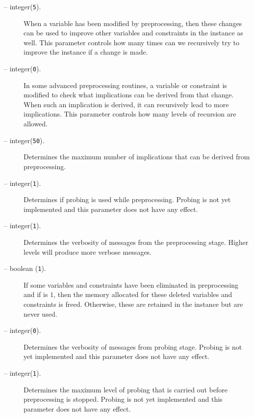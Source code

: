\begin{description}
\item[ -- integer({\tt 5}).]
When a variable has been modified by preprocessing, then these changes can be
used to improve other variables and constraints in the instance as well. This
parameter controls how many times can we recursively try to improve the
instance if a change is made.

\item[ -- integer({\tt 0}).]
In some advanced preprocessing routines, a variable or constraint is modified
to check what implications can be derived from that change. When such an
implication is derived, it can recursively lead to more implications. This
parameter controls how many levels of recursion are allowed.

\item[ -- integer({\tt 50}).]
Determines the maximum number of implications that can be derived from
preprocessing.

\item[ -- integer({\tt 1}).]
Determines if probing is used while preprocessing. Probing is not yet
implemented and this parameter does not have any effect.

\item[ -- integer({\tt 1}).]
Determines the verbosity of messages from the preprocessing stage. Higher
levels will produce more verbose messages.

\item[ -- boolean ({\tt 1}).]
If some variables and constraints have been eliminated in preprocessing and if 
 is $1$, then the memory allocated for these deleted
variables and constraints is freed. Otherwise, these are retained in the
instance but are never used.

\item[ -- integer({\tt 0}).]
Determines the verbosity of messages from probing stage. Probing is not yet
implemented and this parameter does not have any effect.

\item[ -- integer({\tt 1}).]
Determines the maximum level of probing that is carried out before
preprocessing is stopped. Probing is not yet
implemented and this parameter does not have any effect.


\end{description}
